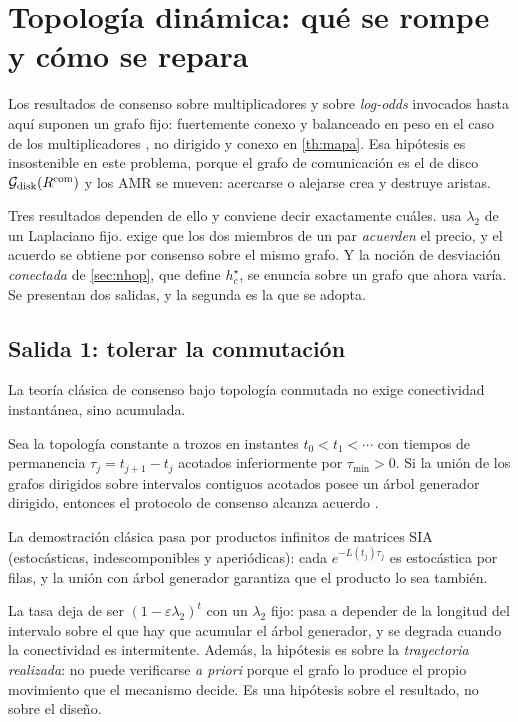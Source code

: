 \section{Topología dinámica: qué se rompe y cómo se repara}
\label{sec:topologia}

Los resultados de consenso sobre multiplicadores y sobre \emph{log-odds}
invocados hasta aquí suponen un grafo fijo: fuertemente conexo y balanceado en
peso en el caso de los multiplicadores \cite{martinezPiazuelo2025gne}, no dirigido
y conexo en \cref{th:mapa}. Esa hipótesis es insostenible en este problema,
porque el grafo de comunicación es el de disco
$\mathcal{G}_{\mathrm{disk}}(R^{\mathrm{com}})$ y los AMR se mueven: acercarse o
alejarse crea y destruye aristas.

Tres resultados dependen de ello y conviene decir exactamente cuáles.
 usa $\lambda_2$ de un Laplaciano fijo. 
exige que los dos miembros de un par \emph{acuerden} el precio, y el acuerdo se
obtiene por consenso sobre el mismo grafo. Y la noción de desviación
\emph{conectada} de \cref{sec:nhop}, que define $h_c^\star$, se enuncia sobre un
grafo que ahora varía. Se presentan dos salidas, y la segunda es la que se
adopta.

\subsection{Salida 1: tolerar la conmutación}

La teoría clásica de consenso bajo topología conmutada no exige conectividad
instantánea, sino acumulada.

\begin{teorema}
\label{th:conmutada}
Sea la topología constante a trozos en instantes $t_0<t_1<\cdots$ con tiempos
de permanencia $\tau_j=t_{j+1}-t_j$ acotados inferiormente por $\tau_{\min}>0$.
Si la unión de los grafos dirigidos sobre intervalos contiguos acotados posee un
árbol generador dirigido, entonces el protocolo de consenso alcanza acuerdo
\cite[Lemas 2.26--2.27]{ren2008distributed}.
\end{teorema}

La demostración clásica pasa por productos infinitos de matrices SIA
(estocásticas, indescomponibles y aperiódicas): cada $e^{-L(t_j)\tau_j}$ es
estocástica por filas, y la unión con árbol generador garantiza que el producto
lo sea también.

\begin{observacion}
\label{obs:coste-conmutada}
La tasa deja de ser $(1-\varepsilon\lambda_2)^t$ con un $\lambda_2$ fijo: pasa a
depender de la longitud del intervalo sobre el que hay que acumular el árbol
generador, y se degrada cuando la conectividad es intermitente. Además, la
hipótesis es sobre la \emph{trayectoria realizada}: no puede verificarse
\emph{a priori} porque el grafo lo produce el propio movimiento que el
mecanismo decide. Es una hipótesis sobre el resultado, no sobre el diseño.
\end{observacion}

